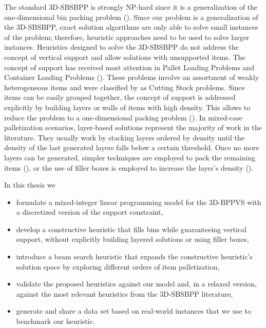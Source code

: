 The standard 3D-SBSBPP is strongly NP-hard since it is a generalization of the one-dimensional bin packing problem (\cite{martello2000three}).
Since our problem is a generalization of the 3D-SBSBPP, exact solution algorithms are only able to solve small instances of the problem; therefore, heuristic approaches need to be used to solve larger instances.
Heuristics designed to solve the 3D-SBSBPP do not address the concept of vertical support and allow solutions with unsupported items.
The concept of support has received most attention in Pallet Loading Problems and Container Loading Problems (\cite{Calzavara2021, kurpel2020exact}).
These problems involve an assortment of weakly heterogeneous items and were classified by \cite{WASCHER20071109} as Cutting Stock problems.
Since items can be easily grouped together, the concept of support is addressed explicitly by building layers or walls of items with high density. This allows to reduce the problem to a one-dimensional packing problem (\cite{BORTFELDT20131}).
In mixed-case palletization scenarios, layer-based solutions represent the majority of work in the literature. They usually work by stacking layers ordered by density until the density of the last generated layers falls below a certain threshold.
Once no more layers can be generated, simpler techniques are employed to pack the remaining items (\cite{elhedhli2019three}), or the use of filler boxes is employed to increase the layer's density (\cite{Calzavara2021}).

In this thesis we
\begin{itemize}
    \item formulate a mixed-integer linear programming model for the 3D-BPPVS with a discretized version of the support constraint,
    \item develop a constructive heuristic that fills bins while guaranteeing vertical support, without explicitly building layered solutions or using filler boxes,
    \item introduce a beam search heuristic that expands the constructive heuristic's solution space by exploring different orders of item palletization,
    \item validate the proposed heuristics against our model and, in a relaxed version, against the most relevant heuristics from the 3D-SBSBPP literature,
    \item generate and share a data set based on real-world instances that we use to benchmark our heuristic.
\end{itemize}

